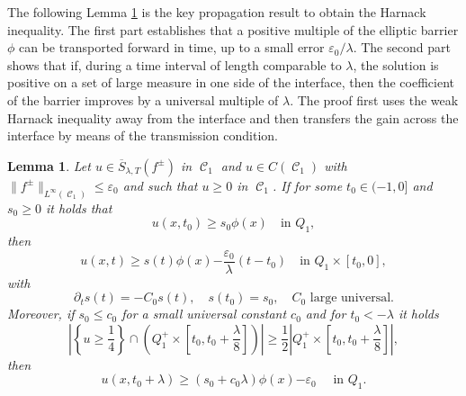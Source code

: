 \documentclass[12pt]{article}
\numberwithin{Theorem}{section}
\newtheorem{Lemma}[Theorem]{Lemma}
\theoremstyle{definition}
\theoremstyle{remark}
\numberwithin{equation}{section}
\DeclareMathOperator{\C}{\mathcal{C}}
\newcommand{\p}{\partial}
\newcommand{\eps}{\varepsilon}
\begin{document}
The following Lemma \ref{Lm:Barrier_improvement} is the key propagation result to obtain the Harnack inequality. The first part  establishes that a positive multiple of the elliptic barrier \(\phi\) can be transported forward in time, up to a small error
\(\varepsilon_0/\lambda\). 
The second part shows that if, during a time
interval of length comparable to \(\lambda\), the solution is positive
on a set of large measure in one side of the interface, then the coefficient of the
barrier improves by a universal multiple of \(\lambda\). The proof first
uses the weak Harnack inequality away from the interface and then
transfers the gain across the interface by means of the transmission
condition.


\begin{Lemma} \label{Lm:Barrier_improvement}
    Let $u \in \overline{S}_{\lambda,T}(f^{\pm})$ in $\C_1$  and $u\in C(\C_1)$ with  $\|f^\pm\|_{L^\infty(\C_1)} \leq \varepsilon_0$ and such that $u \geq 0$ in $\C_1$.
If for some $t_0 \in (-1,0]$ and $s_0 \geq 0$ it holds that 
\begin{equation} \label{eq:initial_time}
    u(x,t_0) \geq s_0 \phi(x) \quad \text{in }Q_1,
\end{equation} 
then 
\begin{equation} \label{eq:boundspacetime}
    u(x,t) \geq s(t) \phi(x)  {- \frac{\eps_0}{\lambda}(t-t_0)}  \quad \text{in }Q_1 \times [t_0,0],
\end{equation}
    with 
    \[
    \p_t s(t)=-C_0s(t), \quad s(t_0)=s_0, \quad C_0\text{ large universal.}
    \]
Moreover, if $s_0 \leq c_0$ for a  small universal constant $c_0$ and for $t_0<-\lambda$ it holds
\begin{equation} \label{eq:meas_est_harn}
    \left| \left\{ u \geq \frac{1}{4} \right\} \cap \left( Q_1^+ \times \left[t_0, t_0+\frac{\lambda}{8} \right]\right) \right| \geq \frac{1}{2} \left|Q_1^+ \times \left[t_0, t_0+\frac{\lambda}{8} \right] \right|,
\end{equation}
    then
    \begin{equation} \label{eq:improv2}
        u(x,t_0 + \lambda) \geq (s_0+c_0 \lambda)\phi(x) { - \eps_0}  \quad \text{ in }Q_{1}.
    \end{equation}
\end{Lemma}
\end{document}
